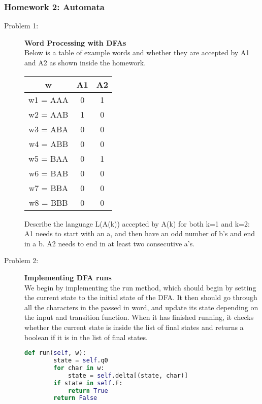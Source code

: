 \documentclass{article}
\theoremstyle{theorem}
\theoremstyle{definition}
\theoremstyle{remark}
\begin{document}
\subsubsection{Homework 2: Automata}
\begin{description}
\item[Problem 1: ] \textbf{Word Processing with DFAs}\\
Below is a table of example words and whether they are accepted by A1 and A2 as shown inside the homework.
    \begin{center}
    \begin{tabular}{||c c c||} 
     \hline
      w & A1 & A2 \\ [0.5ex] 
     \hline\hline
     w1 = AAA & 0 & 1\\
     \hline
     w2 = AAB & 1 & 0 \\
     \hline
     w3 = ABA & 0 & 0 \\
     \hline
     w4 = ABB & 0 & 0 \\
     \hline
     
     w5 = BAA & 0 & 1 \\ 
     \hline
     w6 = BAB & 0 & 0 \\
     \hline
     w7 = BBA & 0 & 0 \\
     \hline
     w8 = BBB & 0 & 0 \\ [1ex] 
     \hline
    \end{tabular}
    \end{center}

Describe the language L(A(k)) accepted by A(k) for both k=1 and k=2: \newline
A1 needs to start with an a, and then have an odd number of b's and end in a b. \newline
A2 needs to end in at least two consecutive a's.

\item[Problem 2: ] \textbf{Implementing DFA runs}\\
We begin by implementing the run method, which should begin by setting the current state to the initial state of the DFA. It then should go through all the characters in the passed in word, and update its state depending on the input and transition function. When it has finished running, it checks whether the current state is inside the list of final states and returns a boolean if it is in the list of final states. 

\begin{lstlisting}[language=Python]
  def run(self, w):
        state = self.q0
        for char in w:
            state = self.delta[(state, char)]
        if state in self.F:
            return True
        return False
\end{lstlisting}


\end{description}
\end{document}
